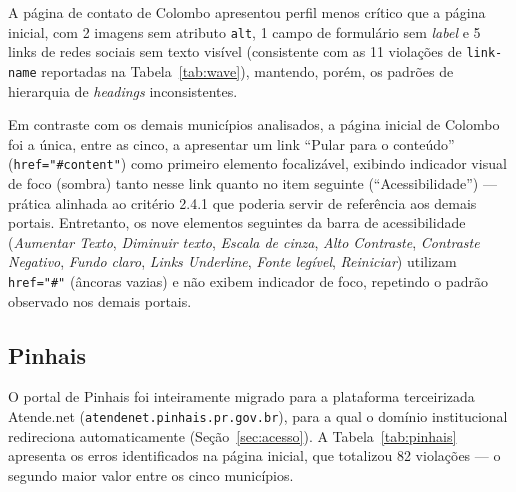 \documentclass[brazil]{ifpr-pinhais}
\begin{document}
A página de contato de Colombo apresentou perfil menos crítico que a página inicial, com 2 imagens sem atributo \texttt{alt}, 1 campo de formulário sem \textit{label} e 5 links de redes sociais sem texto visível (consistente com as 11 violações de \texttt{link-name} reportadas na Tabela~\ref{tab:wave}), mantendo, porém, os padrões de hierarquia de \textit{headings} inconsistentes.

Em contraste com os demais municípios analisados, a página inicial de Colombo foi a única, entre as cinco, a apresentar um link ``Pular para o conteúdo'' (\texttt{href="\#content"}) como primeiro elemento focalizável, exibindo indicador visual de foco (sombra) tanto nesse link quanto no item seguinte (``Acessibilidade'') --- prática alinhada ao critério 2.4.1 que poderia servir de referência aos demais portais. Entretanto, os nove elementos seguintes da barra de acessibilidade (\textit{Aumentar Texto}, \textit{Diminuir texto}, \textit{Escala de cinza}, \textit{Alto Contraste}, \textit{Contraste Negativo}, \textit{Fundo claro}, \textit{Links Underline}, \textit{Fonte legível}, \textit{Reiniciar}) utilizam \texttt{href="\#"} (âncoras vazias) e não exibem indicador de foco, repetindo o padrão observado nos demais portais.

\subsection{Pinhais}
\label{subsec:pinhais}

O portal de Pinhais foi inteiramente migrado para a plataforma terceirizada Atende.net (\texttt{atendenet.pinhais.pr.gov.br}), para a qual o domínio institucional redireciona automaticamente (Seção~\ref{sec:acesso}). A Tabela~\ref{tab:pinhais} apresenta os erros identificados na página inicial, que totalizou 82 violações --- o segundo maior valor entre os cinco municípios.
\end{document}

